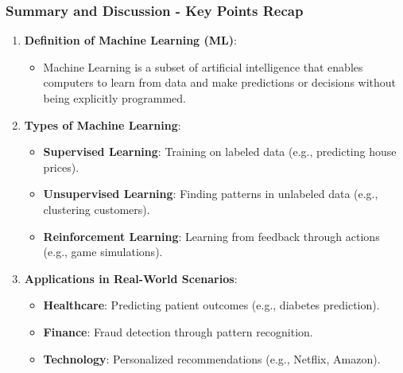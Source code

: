\documentclass[aspectratio=169]{beamer}
\begin{document}
\begin{frame}[fragile]
    \frametitle{Summary and Discussion - Key Points Recap}
    \begin{enumerate}
        \item \textbf{Definition of Machine Learning (ML)}:
        \begin{itemize}
            \item Machine Learning is a subset of artificial intelligence that enables computers to learn from data and make predictions or decisions without being explicitly programmed.
        \end{itemize}

        \item \textbf{Types of Machine Learning}:
        \begin{itemize}
            \item \textbf{Supervised Learning}: Training on labeled data (e.g., predicting house prices).
            \item \textbf{Unsupervised Learning}: Finding patterns in unlabeled data (e.g., clustering customers).
            \item \textbf{Reinforcement Learning}: Learning from feedback through actions (e.g., game simulations).
        \end{itemize}
        
        \item \textbf{Applications in Real-World Scenarios}:
        \begin{itemize}
            \item \textbf{Healthcare}: Predicting patient outcomes (e.g., diabetes prediction).
            \item \textbf{Finance}: Fraud detection through pattern recognition.
            \item \textbf{Technology}: Personalized recommendations (e.g., Netflix, Amazon).
        \end{itemize}
    \end{enumerate}
\end{frame}
\end{document}
